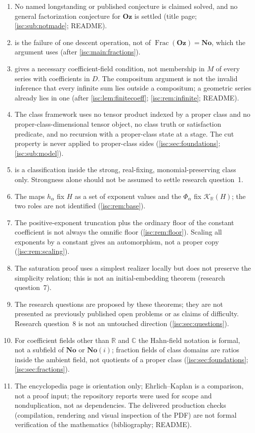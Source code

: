 \documentclass[11pt,letterpaper]{article}
\theoremstyle{definition}
\theoremstyle{remark}
\newcommand{\No}{\mathbf{No}}
\newcommand{\Oz}{\mathbf{Oz}}
\newcommand{\SC}{\No(i)}
\newcommand{\R}{\mathbb R}
\newcommand{\C}{\mathbb C}
\newcommand{\K}[2]{\mathcal K_{#1}(#2)}
\newcommand{\Frac}{\operatorname{Frac}}
\numberwithin{equation}{section}
\begin{document}
\begin{enumerate}[label=S\arabic*.,leftmargin=2.6em,itemsep=2pt]
(title page; \cref{isc:sub:formal}; research question~10; README).
\item No named longstanding or published conjecture is claimed solved, and
no general factorization conjecture for $\Oz$ is settled (title page;
\cref{isc:sub:notmade}; README).
\item {} is the failure of one descent operation, not
of $\Frac(\Oz)=\No$, which the argument uses (after \cref{isc:main:fractions}).
\item {} gives a necessary coefficient-field
condition, not membership in $M$ of every series with coefficients in $D$.
The compositum argument is not the invalid inference that every infinite
sum lies outside a compositum; a geometric series already lies in one
(after \cref{isc:lem:finitecoeff}; \cref{isc:rem:infinite}; README).
\item The class framework uses no tensor product indexed by a proper class
and no proper-class-dimensional tensor object, no class truth or
satisfaction predicate, and no recursion with a proper-class state at a
stage. The cut property is never applied to proper-class sides
(\cref{isc:sec:foundations}; \cref{isc:sub:model}).
\item {} is a classification inside
the strong, real-fixing, monomial-preserving class only. Strongness alone
should not be assumed to settle research question~1.
\item The maps $h_\alpha$ fix $H$ as a set of exponent values and the
$\Phi_\alpha$ fix $\K{\R}{H}$; the two roles are not identified
(\cref{isc:rem:base}).
\item The positive-exponent truncation plus the ordinary floor of the
constant coefficient is not always the omnific floor
(\cref{isc:rem:floor}). Scaling all exponents by a constant gives an
automorphism, not a proper copy (\cref{isc:rem:scaling}).
\item The saturation proof uses a simplest realizer locally but does not
preserve the simplicity relation; this is not an initial-embedding theorem
(research question~7).
\item The research questions are proposed by these theorems; they are not
presented as previously published open problems or as claims of difficulty.
Research question~8 is not an untouched direction (\cref{isc:sec:questions}).
\item For coefficient fields other than $\R$ and $\C$ the Hahn-field
notation is formal, not a subfield of $\No$ or $\SC$; fraction fields of
class domains are ratios inside the ambient field, not quotients of a
proper class (\cref{isc:sec:foundations}; \cref{isc:sec:fractions}).
\item The encyclopedia page is orientation only; Ehrlich--Kaplan is a
comparison, not a proof input; the repository reports were used for scope
and nonduplication, not as dependencies. The delivered production checks
(compilation, rendering and visual inspection of the PDF) are not formal
verification of the mathematics (bibliography; README).
\end{enumerate}
\end{document}
